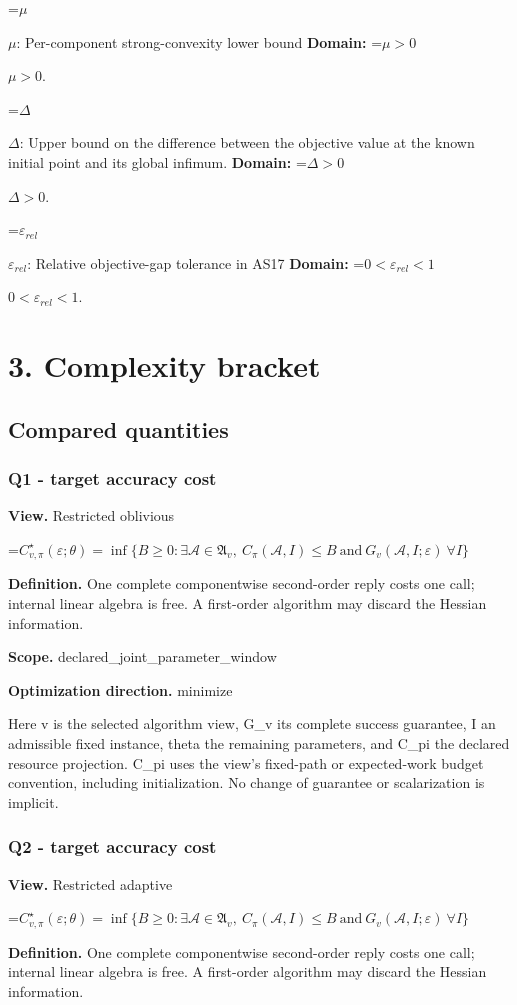 \documentclass[10pt,a4paper]{article}
\newcommand{\AtlasMath}[1]{\par\begingroup\centering\setbox0=\hbox{$\displaystyle #1$}\ifdim\wd0>1.4\linewidth\typeout{ATLAS WIDE FORMULA: \the\wd0}\fi\ifdim\wd0>\linewidth\resizebox{\linewidth}{!}{\box0}\else\box0\fi\par\endgroup}
\newcommand{\AtlasInlineMath}[1]{\begingroup\setbox0=\hbox{$#1$}\ifdim\wd0>.4\linewidth\endgroup\AtlasMath{#1}\else\endgroup$#1$\fi}
\begin{document}
\AtlasInlineMath{\mu}: Per-component strong-convexity lower bound \textbf{Domain:} \AtlasInlineMath{\mu>0}.

\AtlasInlineMath{\Delta}: Upper bound on the difference between the objective value at the known initial point and its global infimum. \textbf{Domain:} \AtlasInlineMath{\Delta>0}.

\AtlasInlineMath{\varepsilon_{rel}}: Relative objective-gap tolerance in AS17 \textbf{Domain:} \AtlasInlineMath{0<\varepsilon_{rel}<1}.

\section{3. Complexity bracket}
\subsection{Compared quantities}
\subsubsection{Q1 - target accuracy cost}
\textbf{View.} Restricted oblivious

\AtlasMath{C^\star_{v,\pi}(\varepsilon;\theta)=\inf\{B\ge0:\exists\mathcal A\in\mathfrak A_v,\ C_\pi(\mathcal A,I)\le B\ \text{and}\ G_v(\mathcal A,I;\varepsilon)\ \forall I\}}
\textbf{Definition.} One complete componentwise second-order reply costs one call; internal linear algebra is free. A first-order algorithm may discard the Hessian information.

\textbf{Scope.} declared\_joint\_parameter\_window

\textbf{Optimization direction.} minimize

Here v is the selected algorithm view, G\_v its complete success guarantee, I an admissible fixed instance, theta the remaining parameters, and C\_pi the declared resource projection. C\_pi uses the view's fixed-path or expected-work budget convention, including initialization. No change of guarantee or scalarization is implicit.

\subsubsection{Q2 - target accuracy cost}
\textbf{View.} Restricted adaptive

\AtlasMath{C^\star_{v,\pi}(\varepsilon;\theta)=\inf\{B\ge0:\exists\mathcal A\in\mathfrak A_v,\ C_\pi(\mathcal A,I)\le B\ \text{and}\ G_v(\mathcal A,I;\varepsilon)\ \forall I\}}
\textbf{Definition.} One complete componentwise second-order reply costs one call; internal linear algebra is free. A first-order algorithm may discard the Hessian information.
\end{document}
